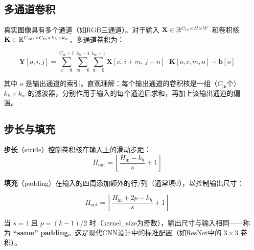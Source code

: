\subsection{多通道卷积}

真实图像具有多个通道（如RGB三通道）。对于输入 $\mathbf{X} \in \mathbb{R}^{C_{\text{in}} \times H \times W}$ 和卷积核 $\mathbf{K} \in \mathbb{R}^{C_{\text{out}} \times C_{\text{in}} \times k_h \times k_w}$，多通道卷积为：

\[
\mathbf{Y}[o, i, j] = \sum_{c=0}^{C_{\text{in}}-1}\sum_{m=0}^{k_h-1}\sum_{n=0}^{k_w-1} \mathbf{X}[c,\, i+m,\, j+n] \cdot \mathbf{K}[o, c, m, n] + \mathbf{b}[o]
\]

其中 $o$ 是输出通道的索引。直观理解：每个输出通道的卷积核是一组（$C_{\text{in}}$个）$k_h \times k_w$ 的滤波器，分别作用于输入的每个通道后求和，再加上该输出通道的偏置。

\subsection{步长与填充}

\textbf{步长}（stride）控制卷积核在输入上的滑动步距：
\[
H_{\text{out}} = \left\lfloor\frac{H_{\text{in}} - k_h}{s} + 1\right\rfloor
\]

\textbf{填充}（padding）在输入的四周添加额外的行/列（通常填0），以控制输出尺寸：

\[
H_{\text{out}} = \left\lfloor\frac{H_{\text{in}} + 2p - k_h}{s} + 1\right\rfloor
\]

当 $s = 1$ 且 $p = (k-1)/2$ 时（kernel\_size为奇数），输出尺寸与输入相同——称为 \textbf{``same'' padding}。这是现代CNN设计中的标准配置（如ResNet中的 $3\times3$ 卷积）。

